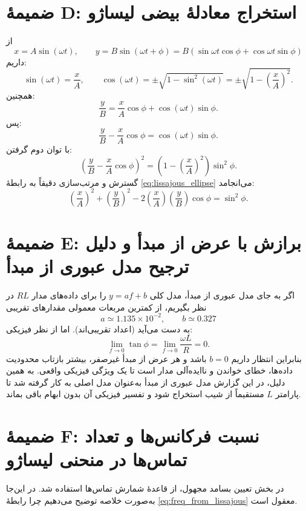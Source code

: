 \documentclass[a4paper, 11pt]{article}
\begin{document}
\section{ضمیمهٔ D: استخراج معادلهٔ بیضی لیساژو}

از
\[
x=A\sin(\omega t),\qquad y=B\sin(\omega t+\phi)=B(\sin\omega t\cos\phi+\cos\omega t\sin\phi)
\]
داریم:
\[
\sin(\omega t)=\frac{x}{A},\qquad
\cos(\omega t)=\pm\sqrt{1-\sin^2(\omega t)}=\pm\sqrt{1-\left(\frac{x}{A}\right)^2}.
\]
همچنین:
\[
\frac{y}{B}=\frac{x}{A}\cos\phi+\cos(\omega t)\sin\phi.
\]
پس:
\[
\frac{y}{B}-\frac{x}{A}\cos\phi=\cos(\omega t)\sin\phi.
\]
با توان دوم گرفتن:
\[
\left(\frac{y}{B}-\frac{x}{A}\cos\phi\right)^2=\left(1-\left(\frac{x}{A}\right)^2\right)\sin^2\phi.
\]
گسترش و مرتب‌سازی دقیقاً به رابطهٔ \eqref{eq:lissajous_ellipse} می‌انجامد:
\[
\left(\frac{x}{A}\right)^2+\left(\frac{y}{B}\right)^2-2\left(\frac{x}{A}\right)\left(\frac{y}{B}\right)\cos\phi=\sin^2\phi.
\]

\section{ضمیمهٔ E: برازش با عرض از مبدأ و دلیل ترجیح مدل عبوری از مبدأ}

اگر به جای مدل عبوری از مبدأ، مدل کلی \(y=af+b\) را برای داده‌های مدار $RL$ در نظر بگیریم، از کمترین مربعات معمولی مقدارهای تقریبی
\[
a\simeq 1.135\times 10^{-2},\qquad b\simeq 0.327
\]
به دست می‌آید (اعداد تقریبی‌اند). اما از نظر فیزیکی:
\[
\lim_{f\to 0}\tan\phi=\lim_{f\to 0}\frac{\omega L}{R}=0.
\]
بنابراین انتظار داریم \(b=0\) باشد و هر عرض از مبدأ غیرصفر، بیشتر بازتاب محدودیت داده‌ها، خطای خواندن و ناایده‌آلی مدار است تا یک ویژگی فیزیکی واقعی. به همین دلیل، در این گزارش مدل عبوری از مبدأ به‌عنوان مدل اصلی به کار گرفته شد تا پارامتر \(L\) مستقیماً از شیب استخراج شود و تفسیر فیزیکی آن بدون ابهام باقی بماند.


\section{ضمیمهٔ F: نسبت فرکانس‌ها و تعداد تماس‌ها در منحنی لیساژو}

در بخش تعیین بسامد مجهول، از قاعدهٔ شمارش تماس‌ها استفاده شد. در این‌جا به‌صورت خلاصه توضیح می‌دهیم چرا رابطهٔ \eqref{eq:freq_from_lissajous} معقول است.
\end{document}
